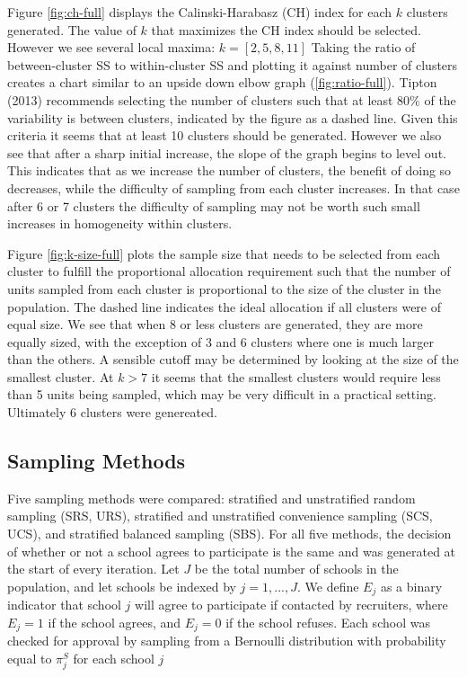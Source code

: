 \documentclass[man,floatsintext]{apa6}
\begin{document}
Figure \ref{fig:ch-full} displays the Calinski-Harabasz (CH) index for each \(k\) clusters generated. The value of \(k\) that maximizes the CH index should be selected. However we see several local maxima: \(k = [2, 5, 8, 11]\) Taking the ratio of between-cluster SS to within-cluster SS and plotting it against number of clusters creates a chart similar to an upside down elbow graph (\ref{fig:ratio-full}). Tipton (2013) recommends selecting the number of clusters such that at least 80\% of the variability is between clusters, indicated by the figure as a dashed line. Given this criteria it seems that at least 10 clusters should be generated. However we also see that after a sharp initial increase, the slope of the graph begins to level out. This indicates that as we increase the number of clusters, the benefit of doing so decreases, while the difficulty of sampling from each cluster increases. In that case after 6 or 7 clusters the difficulty of sampling may not be worth such small increases in homogeneity within clusters.

Figure \ref{fig:k-size-full} plots the sample size that needs to be selected from each cluster to fulfill the proportional allocation requirement such that the number of units sampled from each cluster is proportional to the size of the cluster in the population. The dashed line indicates the ideal allocation if all clusters were of equal size. We see that when 8 or less clusters are generated, they are more equally sized, with the exception of 3 and 6 clusters where one is much larger than the others. A sensible cutoff may be determined by looking at the size of the smallest cluster. At \(k > 7\) it seems that the smallest clusters would require less than 5 units being sampled, which may be very difficult in a practical setting. Ultimately 6 clusters were genereated.

\hypertarget{sampling-methods}{%
\subsection{Sampling Methods}\label{sampling-methods}}

Five sampling methods were compared: stratified and unstratified random sampling (SRS, URS), stratified and unstratified convenience sampling (SCS, UCS), and stratified balanced sampling (SBS). For all five methods, the decision of whether or not a school agrees to participate is the same and was generated at the start of every iteration. Let \(J\) be the total number of schools in the population, and let schools be indexed by \(j = 1, ..., J\). We define \(E_j\) as a binary indicator that school \(j\) will agree to participate if contacted by recruiters, where \(E_j = 1\) if the school agrees, and \(E_j = 0\) if the school refuses. Each school was checked for approval by sampling from a Bernoulli distribution with probability equal to \(\pi^S_j\) for each school \(j\)
\end{document}

